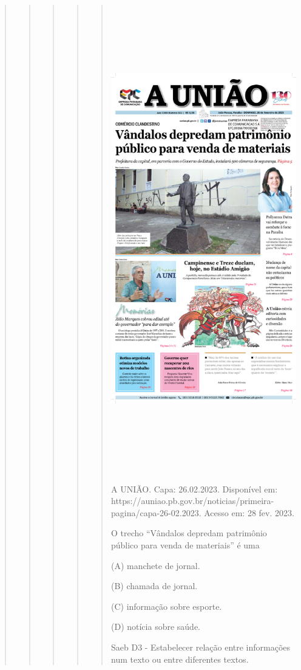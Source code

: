 \begin{quote}
\begin{quote}
\begin{quote}
\begin{quote}
\begin{quote}
\includegraphics[width=4.47917in,height=8.00000in]{media/image37.png}

A UNIÃO. Capa: 26.02.2023. Disponível em:
https://auniao.pb.gov.br/noticias/primeira-pagina/capa-26-02.2023.
Acesso em: 28 fev. 2023.

O trecho ``Vândalos depredam patrimônio público para venda de
materiais'' é uma

(A) manchete de jornal.

(B) chamada de jornal.

(C) informação sobre esporte.

(D) notícia sobre saúde.

Saeb D3 - Estabelecer relação entre informações num texto ou entre
diferentes textos.


\end{quote}
\end{quote}
\end{quote}
\end{quote}
\end{quote}
